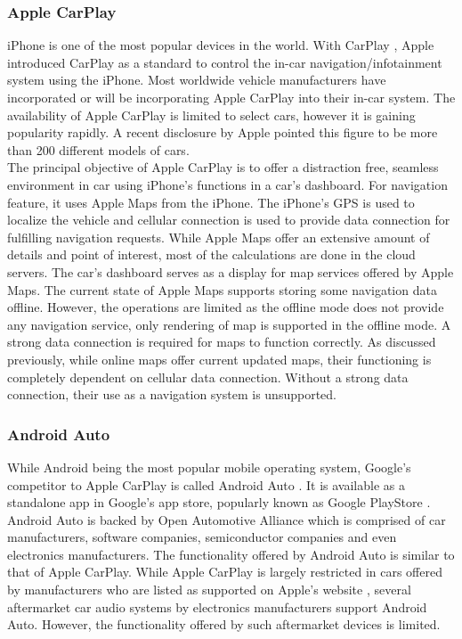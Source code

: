 \subsubsection{Apple CarPlay}
iPhone is one of the most popular devices in the world. With CarPlay \cite{AppleCarPlay}, Apple introduced CarPlay as a standard to control the in-car navigation/infotainment system using the iPhone. Most worldwide vehicle manufacturers have incorporated or will be incorporating Apple CarPlay into their in-car system. The availability of Apple CarPlay is limited to select cars, however it is gaining popularity rapidly. A recent disclosure by Apple \cite{Carplaymodels} pointed this figure to be more than 200 different models of cars. \\

The principal objective of Apple CarPlay is to offer a distraction free, seamless environment in car using iPhone's functions in a car's dashboard. For navigation feature, it uses Apple Maps \cite{AppleMaps} from the iPhone. The iPhone's GPS is used to localize the vehicle and cellular connection is used to provide data connection for fulfilling navigation requests. While Apple Maps offer an extensive amount of details and point of interest, most of the calculations are done in the cloud servers. The car's dashboard serves as a display for map services offered by Apple Maps. The current state of Apple Maps supports storing some navigation data offline. However, the operations are limited as the offline mode does not provide any navigation service, only rendering of map is supported in the offline mode. A strong data connection is required for maps to function correctly. As discussed previously, while online maps offer current updated maps, their functioning is completely dependent on cellular data connection. Without a strong data connection, their use as a navigation system is unsupported. 

\subsubsection{Android Auto}
While Android being the most popular mobile operating system, Google's competitor to Apple CarPlay is called Android Auto \cite{AndroidAuto}. It is available as a standalone app in Google's app store, popularly known as Google PlayStore \cite{playstore}. Android Auto is backed by Open Automotive Alliance \cite{oaa} which is comprised of car manufacturers, software companies, semiconductor companies and even electronics manufacturers. The functionality offered by Android Auto is similar to that of Apple CarPlay. While Apple CarPlay is largely restricted in cars offered by manufacturers who are listed as supported on Apple's website \cite{Carplaymodels}, several aftermarket car audio systems by electronics manufacturers support Android Auto. However, the functionality offered by such aftermarket devices is limited. \\

